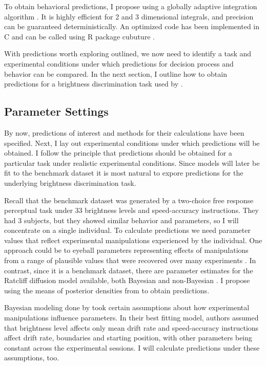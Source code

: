 \documentclass[12pt]{report}
\begin{document}
To obtain behavioral predictions, I propose using a globally adaptive integration algorithm  \citep{GenMal1980,BerJar1991}. It is highly efficient for 2 and 3 dimensional integrals, and precision can be guaranteed deterministically. An optimized code has been implemented in C and can be called using R package cubuture \citep{JohNar2013}.

With predictions worth exploring outlined, we now need to identify a task and experimental conditions under which predictions for decision process and behavior can be compared. In the next section, I outline how to obtain predictions for a brightness discrimination task used by \citet{RatRou1998}.

\subsection{Parameter Settings}
By now, predictions of interest and methods for their calculations have been specified. Next, I lay out experimental conditions under which predictions will be obtained. I follow the principle that predictions should be obtained for a particular task under realistic experimental conditions. Since models will later be fit to the benchmark dataset it is most natural to expore predictions for the underlying brightness discrimination task. 

Recall that the \citet{RatRou1998} benchmark dataset was generated by a two-choice free response perceptual task under 33 brightness levels and speed-accuracy instructions. They had 3 subjects, but they showed similar behavior and parameters, so I will concentrate on a single individual. To calculate predictions we need parameter values that reflect experimental manipulations experienced by the individual. One approach could be to eyeball parameters representing effects of manipulations from a range of plausible values that were recovered over many experiments \citep{MatWag2009}. In contrast, since it is a benchmark dataset, there are parameter estimates for the Ratcliff diffusion model available, both Bayesian and non-Bayesian \citep{RatRou1998,VanTue2011}. I propose using the means of posterior densities from \citet{VanTue2011} to obtain predictions.

Bayesian modeling done by \citet{VanTue2011} took certain assumptions about how experimental manipulations influence parameters. In their best fitting model, authors assumed that brightness level affects only mean drift rate and speed-accuracy instructions affect drift rate, boundaries and starting position, with other parameters being constant across the experimental sessions. I will calculate predictions under these assumptions, too.
\end{document}
